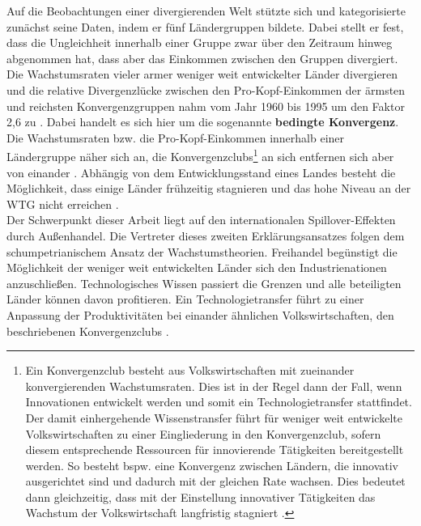 Auf die Beobachtungen einer divergierenden Welt st{\"u}tzte sich \citet{MayerFoulkes.2006} und kategorisierte zun{\"a}chst seine Daten, indem er f{\"u}nf L{\"a}ndergruppen bildete. Dabei stellt er fest, dass die Ungleichheit innerhalb einer Gruppe zwar {\"u}ber den Zeitraum hinweg abgenommen hat, dass aber das Einkommen zwischen den Gruppen divergiert. Die Wachstumsraten vieler armer weniger weit entwickelter L{\"a}nder divergieren und die relative Divergenzl{\"u}cke zwischen den Pro-Kopf-Einkommen der {\"a}rmsten und reichsten Konvergenzgruppen nahm vom Jahr 1960 bis 1995 um den Faktor 2,6 zu \citep{MayerFoulkes.2006}. Dabei handelt es sich hier um die sogenannte \textbf{bedingte Konvergenz}. Die Wachstumsraten bzw. die Pro-Kopf-Einkommen innerhalb einer L{\"a}ndergruppe n{\"a}her sich an, die Konvergenzclubs\footnote{Ein Konvergenzclub besteht aus Volkswirtschaften mit zueinander konvergierenden Wachstumsraten. Dies ist in der Regel dann der Fall, wenn Innovationen entwickelt werden und somit ein Technologietransfer stattfindet. Der damit einhergehende Wissenstransfer f{\"u}hrt f{\"u}r weniger weit entwickelte Volkswirtschaften zu einer Eingliederung in den Konvergenzclub, sofern diesem entsprechende Ressourcen f{\"u}r innovierende T{\"a}tigkeiten bereitgestellt werden. So besteht bspw. eine Konvergenz zwischen L{\"a}ndern, die innovativ ausgerichtet sind und dadurch mit der gleichen Rate wachsen. Dies bedeutet dann gleichzeitig, dass mit der Einstellung innovativer T{\"a}tigkeiten das Wachstum der Volkswirtschaft langfristig stagniert \citep{Aghion.2015}.} an sich entfernen sich aber von einander \citep{Quah.1993,Howitt.2000,Howitt.2005}. Abh{\"a}ngig von dem Entwicklungsstand eines Landes besteht die M{\"o}glichkeit, dass einige L{\"a}nder fr{\"u}hzeitig stagnieren und das hohe Niveau an der WTG nicht erreichen \citep{Aghion.1992,Barro.1997,Howitt.2005}.\\


Der Schwerpunkt dieser Arbeit liegt auf den internationalen Spillover-Effekten durch Au{\ss}enhandel.
Die Vertreter dieses zweiten Erkl{\"a}rungsansatzes folgen dem schumpetrianischem Ansatz der Wachstumstheorien. Freihandel beg{\"u}nstigt die M{\"o}glichkeit der weniger weit entwickelten L{\"a}nder sich den Industrienationen anzuschlie{\ss}en. Technologisches Wissen passiert die Grenzen und alle beteiligten L{\"a}nder k{\"o}nnen davon profitieren. 
Ein Technologietransfer f{\"u}hrt zu einer Anpassung der Produktivit{\"a}ten bei einander {\"a}hnlichen Volkswirtschaften, den beschriebenen Konvergenzclubs \citep{Durlauf.1995, Quah.1993,Quah.1997}.\\


